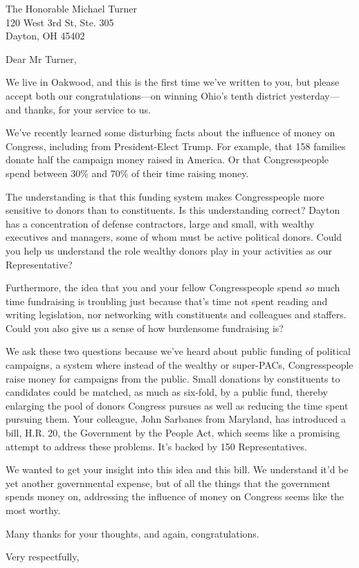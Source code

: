 \documentclass{letter}
\begin{document}
\begin{letter}{
  The Honorable Michael Turner \\
  120 West 3rd St, Ste. 305 \\
  Dayton, OH 45402}

\opening{Dear Mr Turner,}

We live in Oakwood, and this is the first time we've written to you, but please accept both our congratulations---on winning Ohio's tenth district yesterday---and thanks, for your service to us.

We've recently learned some disturbing facts about the influence of money on Congress, including from President-Elect Trump. For example, that 158 families donate half the campaign money raised in America. Or that Congresspeople spend between 30\% and 70\% of their time raising money.

The understanding is that this funding system makes Congresspeople more sensitive to donors than to constituents. Is this understanding correct? Dayton has a concentration of defense contractors, large and small, with wealthy executives and managers, some of whom must be active political donors. Could you help us understand the role wealthy donors play in your activities as our Representative?

Furthermore, the idea that you and your fellow Congresspeople spend {\em so} much time fundraising is troubling just because that's time not spent reading and writing legislation, nor networking with constituents and colleagues and staffers. Could you also give us a sense of how burdensome fundraising is?

We ask these two questions because we've heard about public funding of political campaigns, a system where instead of the wealthy or super-PACs, Congresspeople raise money for campaigns from the public. Small donations by constituents to candidates could be matched, as much as six-fold, by a public fund, thereby enlarging the pool of donors Congress pursues as well as reducing the time spent pursuing them. Your colleague, John Sarbanes from Maryland, has introduced a bill, H.R. 20, the Government by the People Act, which seems like a promising attempt to address these problems. It's backed by 150 Representatives.

We wanted to get your insight into this idea and this bill. We understand it'd be yet another governmental expense, but of all the things that the government spends money on, addressing the influence of money on Congress seems like the most worthy.

Many thanks for your thoughts, and again, congratulations.

\closing{Very respectfully,}


\end{letter}
\end{document}
